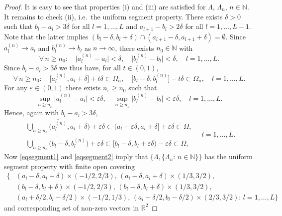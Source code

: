 \documentclass[a4paper,reqno]{amsart}
\begin{document}
\begin{proof}
It is easy to see that properties (i) and (iii) are satisfied for $\Lambda$, $\Lambda_n$, $n\in{\mathbb{N}}$.
It remains to check (ii), i.e.\ the uniform segment property. 
There exists $\delta>0$ such that $b_l-a_l>3\delta$ for all $l=1,\dots,L$ and $a_{l+1}-b_l>2\delta$ for all $l=1,\dots,L-1$.
Note that the latter implies $(b_l-\delta,b_l+\delta)\cap (a_{l+1}-\delta,a_{l+1}+\delta)=\emptyset$.
Since $a_l^{(n)}\to a_l$ and $b_l^{(n)}\to b_l$ as $n\to\infty$, there exists $n_0\in{\mathbb{N}}$
with $$\forall\,n\geq n_0:\quad \big|a_l^{(n)}-a_l\big|<\delta, \quad \big|b_l^{(n)}-b_l\big|<\delta, \quad l=1,\dots,L.$$
Since $b_l-a_l>3\delta$ we thus have, for all $t\in (0,1)$, 
\begin{equation} \forall\,n\geq n_0:\quad\big[a_l^{(n)},a_l+\delta\big]+t \delta\subset\Omega_n, \quad \big[b_l-\delta,b_l^{(n)}\big]-t \delta\subset\Omega_n, \quad l=1,\dots,L.\label{eqsegment1}\end{equation}
For any $\varepsilon\in (0,1)$ there exists $n_\varepsilon\geq n_0$ such that 
$$\sup_{n\geq n_\varepsilon}\big|a_l^{(n)}-a_l\big|<\varepsilon\delta, \quad \sup_{n\geq n_\varepsilon}\big|b_l^{(n)}-b_l\big|<\varepsilon\delta, \quad l=1,\dots,L.$$
Hence, again with $b_l-a_l>3\delta$,
\begin{equation}\label{eqsegment2}
\begin{array}{l}
 \overline{\bigcup_{n\geq n_\varepsilon}\big(a_l^{(n)},a_l+\delta\big)}+\varepsilon\delta\subset (a_l-\varepsilon \delta,a_l+\delta]+\varepsilon\delta\subset\Omega, \\[2mm]
 \overline{\bigcup_{n\geq n_\varepsilon}\big(b_l-\delta,b_l^{(n)}\big)}+\varepsilon\delta\subset [b_l-\delta,b_l+\varepsilon\delta)-\varepsilon\delta\subset\Omega, 
\end{array}\quad l=1,\dots,L.
\end{equation}
Now \eqref{eqsegment1} and \eqref{eqsegment2} imply that $\{\Lambda,\{\Lambda_n:\,n\in{\mathbb{N}}\}\}$
has the uniform segment property with finite open covering
\begin{align*}
\Big\{&(a_l-\delta,a_l+\delta)\times (-1/2,2/3),\,
(a_l-\delta,a_l+\delta)\times (1/3,3/2),\\
&(b_l-\delta,b_l+\delta)\times (-1/2,2/3),\,
(b_l-\delta,b_l+\delta)\times (1/3,3/2),\\
&(a_l+\delta/2,b_l-\delta/2)\times (-1/2,1/3),\,
(a_l+\delta/2,b_l-\delta/2)\times (2/3, 3/2):\,l=1,\dots,L\Big\}
\end{align*}
and corresponding set of non-zero vectors in ${\mathbb{R}}^2$

\end{proof}
\end{document}
